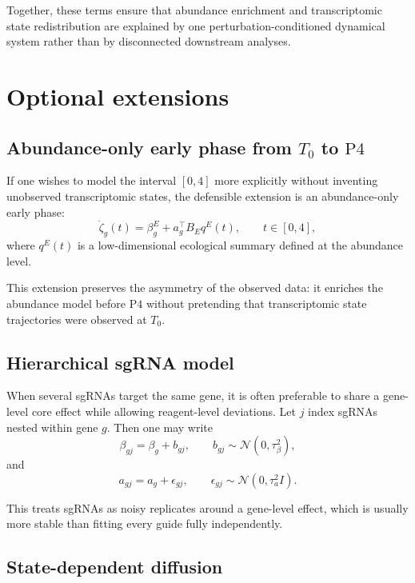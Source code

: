 \documentclass[11pt]{article}
\newcommand{\1}{\mathbf{1}}
\newcommand{\Tzero}{T_0}
\newcommand{\Pfour}{\mathrm{P4}}
\theoremstyle{plain}
\begin{document}
Together, these terms ensure that abundance enrichment and transcriptomic state redistribution are explained by one perturbation-conditioned dynamical system rather than by disconnected downstream analyses.

\section{Optional extensions}

\subsection{Abundance-only early phase from $\Tzero$ to $\Pfour$}

If one wishes to model the interval $[0,4]$ more explicitly without inventing unobserved transcriptomic states, the defensible extension is an abundance-only early phase:
\begin{equation}
\dot\zeta_g(t)=\beta_g^{E}+a_g^\top B_E q^E(t),
\qquad t\in[0,4],
\label{eq:early_phase_abundance}
\end{equation}
where $q^E(t)$ is a low-dimensional ecological summary defined at the abundance level.

This extension preserves the asymmetry of the observed data: it enriches the abundance model before $\Pfour$ without pretending that transcriptomic state trajectories were observed at $\Tzero$.

\subsection{Hierarchical sgRNA model}

When several sgRNAs target the same gene, it is often preferable to share a gene-level core effect while allowing reagent-level deviations. Let $j$ index sgRNAs nested within gene $g$. Then one may write
\begin{equation}
\beta_{gj}=\beta_g+b_{gj},
\qquad b_{gj}\sim\mathcal N(0,\tau_\beta^2),
\label{eq:sg_beta}
\end{equation}
and
\begin{equation}
a_{gj}=a_g+\epsilon_{gj},
\qquad \epsilon_{gj}\sim\mathcal N(0,\tau_a^2 I).
\label{eq:sg_embedding}
\end{equation}

This treats sgRNAs as noisy replicates around a gene-level effect, which is usually more stable than fitting every guide fully independently.

\subsection{State-dependent diffusion}
\end{document}

